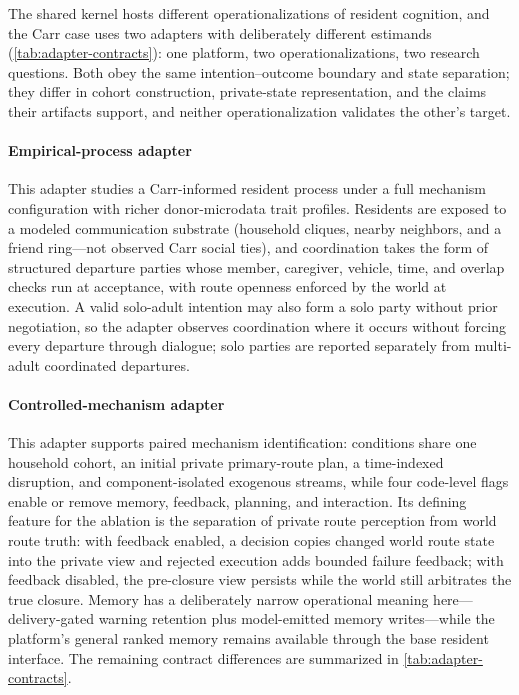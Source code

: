 \documentclass[journal]{IEEEtran}
\begin{document}
The shared kernel hosts different operationalizations of resident cognition,
and the Carr case uses two adapters with deliberately different estimands
(\cref{tab:adapter-contracts}): one platform, two operationalizations, two
research questions. Both obey the same intention--outcome boundary and state
separation; they differ in cohort construction, private-state representation,
and the claims their artifacts support, and neither operationalization
validates the other's target.

\paragraph{Empirical-process adapter}
This adapter studies a Carr-informed resident process under a full mechanism
configuration with richer donor-microdata trait profiles. Residents are exposed
to a modeled communication substrate (household cliques, nearby neighbors, and
a friend ring---not observed Carr social ties), and coordination takes the form
of structured departure parties whose member, caregiver, vehicle, time, and
overlap checks run at acceptance, with route openness enforced by the world at
execution. A valid solo-adult intention may also form a solo party without
prior negotiation, so the adapter observes coordination where it occurs without
forcing every departure through dialogue; solo parties are reported separately
from multi-adult coordinated departures.

\paragraph{Controlled-mechanism adapter}
This adapter supports paired mechanism identification: conditions share one
household cohort, an initial private primary-route plan, a time-indexed
disruption, and component-isolated exogenous streams, while four code-level
flags enable or remove memory, feedback, planning, and interaction. Its
defining feature for the ablation is the separation of private route perception
from world route truth: with feedback enabled, a decision copies changed world
route state into the private view and rejected execution adds bounded failure
feedback; with feedback disabled, the pre-closure view persists while the world
still arbitrates the true closure. Memory has a deliberately narrow operational
meaning here---delivery-gated warning retention plus model-emitted memory
writes---while the platform's general ranked memory
\cite{park2023generativeagents} remains available through the base resident
interface. The remaining contract differences are summarized in
\cref{tab:adapter-contracts}.
\end{document}
